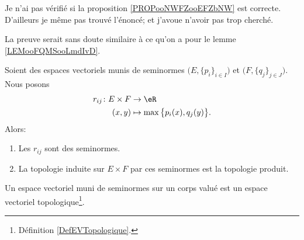 \begin{probleme}        %
	Je n'ai pas vérifié si la proposition \ref{PROPooNWFZooEFZbNW} est correcte. D'ailleurs je même pas trouvé l'énoncé; et j'avoue n'avoir pas trop cherché.

	La preuve serait sans doute similaire à ce qu'on a pour le lemme \ref{LEMooFQMSooLmdIvD}.
\end{probleme}

\begin{proposition}      \label{PROPooNWFZooEFZbNW}
	Soient des espaces vectoriels munis de seminormes \( \big( E,\{ p_i \}_{i\in I} \big) \) et \( \big( F,\{ q_j \}_{j\in J} \big)\). Nous posons
	\begin{equation}        \label{EQooTFVXooORZrFV}
		\begin{aligned}
			r_{ij}\colon E\times F & \to \eR                                   \\
			(x,y)                  & \mapsto \max\big\{ p_i(x), q_j(y) \big\}.
		\end{aligned}
	\end{equation}
	Alors:
	\begin{enumerate}
		\item
		      Les \( r_{ij}\) sont des seminormes.
		\item
		      La topologie induite sur \( E\times F\) par ces seminormes est la topologie produit.
	\end{enumerate}
\end{proposition}

\begin{proposition}       \label{PROPooGXGQooLRTwvH}
	Un espace vectoriel muni de seminormes sur un corps valué est un espace vectoriel topologique\footnote{Définition \ref{DefEVTopologique}.}.
\end{proposition}

